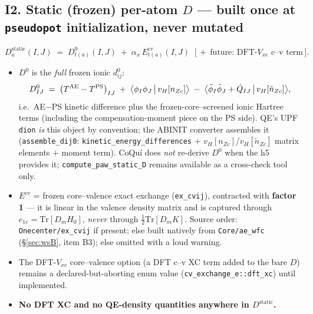 \documentclass[11pt]{article}
\newcommand{\code}[1]{\texttt{\small #1}}
\newcommand{\Dstat}{D^{\mathrm{static}}}
\newcommand{\Qhat}{\hat{Q}}
\newcommand{\phit}{\tilde{\phi}}
\begin{document}
\subsection*{I2. Static (frozen) per-atom $D$ --- built once at
\code{pseudopot} initialization, never mutated}

\begin{keybox}
\begin{equation}
\Dstat_{a}(I,J) \;=\; D^{0}_{t(a)}(I,J)
\;+\; \alpha_x\, E^{cv}_{t(a)}(I,J)
\;\;\big[\,+\ \text{future: DFT-$V_{xc}$ c--v term}\,\big].
\label{eq:dstatic}
\end{equation}
\end{keybox}

\begin{itemize}[leftmargin=1.6em]
\item $D^{0}$ is the \emph{full} frozen ionic $d^{0}_{ij}$:
\begin{equation}
D^{0}_{IJ} \;=\; \big(T^{\rm AE} - T^{\rm PS}\big)_{IJ}
\;+\; \big\langle \phi_I\phi_J \,\big|\, v_H[n_{Zc}] \big\rangle
\;-\; \big\langle \phit_I\phit_J + \Qhat_{IJ} \,\big|\, v_H[\tilde n_{Zc}] \big\rangle ,
\label{eq:d0}
\end{equation}
i.e.\ AE$-$PS kinetic difference plus the frozen-core--screened ionic
Hartree terms (including the compensation-moment piece on the PS side). QE's
UPF \code{dion} \emph{is} this object by convention; the ABINIT converter
assembles it (\code{assemble\_dij0}: \code{kinetic\_energy\_differences} +
$v_{H}[n_{Zc}]$/$v_{H}[\tilde n_{Zc}]$ matrix elements + moment term).
CoQu\'i does \emph{not} re-derive $D^0$ when the h5 provides it;
\code{compute\_paw\_static\_D} remains available as a cross-check tool only.
\item $E^{cv}$ = frozen core--valence exact exchange (\code{ex\_cvij}),
contracted with \textbf{factor 1} --- it is linear in the valence density
matrix and is captured through $e_{1e} = \mathrm{Tr}[D_m H_0]$, \emph{never}
through $\tfrac12\mathrm{Tr}[D_m K]$. Source order:
\code{Onecenter/ex\_cvij} if present; else built natively from
\code{Core/ae\_wfc} (\S\ref{sec:wsB}, item B3); else omitted with a loud
warning.
\item The DFT-$V_{xc}$ core--valence option (a DFT c--v XC term added to the
bare $D$) remains a declared-but-aborting enum value
(\code{cv\_exchange\_e::dft\_xc}) until implemented.
\item \textbf{No DFT XC and no QE-density quantities anywhere in
$\Dstat$.}
\end{itemize}
\end{document}
